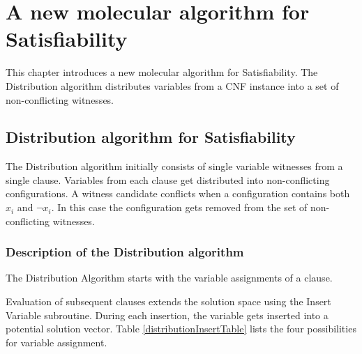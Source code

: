 
\chapter{A new molecular algorithm for {\sc Satisfiability}}

This chapter introduces a new molecular algorithm for {\sc Satisfiability}.  The Distribution algorithm distributes variables from a CNF instance into a set of non-conflicting witnesses.

\section{Distribution algorithm for {\sc Satisfiability}}


The Distribution algorithm initially consists of single variable witnesses from a single clause.  Variables from each clause get distributed into non-conflicting configurations.  A witness candidate conflicts when a configuration contains both $x_i$ and $\neg x_i$.  In this case the configuration gets removed from the set of non-conflicting witnesses.  



	\subsection{Description of the Distribution algorithm}
		

The {\sc Distribution Algorithm} starts with the variable assignments of a clause.



		
Evaluation of subsequent clauses extends the solution space using the {\sc Insert Variable} subroutine.  During each insertion, the variable gets inserted into a potential solution vector.  Table \ref{distributionInsertTable} lists the four possibilities for variable assignment.

